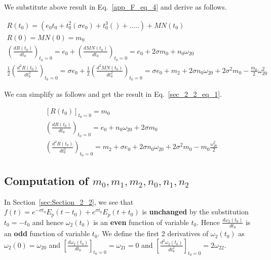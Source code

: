 \documentclass[11pt]{elsarticle}
\begin{document}
We substitute above result in Eq.~\ref{app_F_eq_4}  and derive as follows.

\begin{eqnarray*}\label{app_F_3_eq_3}  
R(t_0)= ( e_0 t_0 +t_0^2 (  \sigma e_0) + t_0^3 () + ..... ) + MN(t_0) \\
R(0) = MN(0) = m_0 \\
(\frac{dR(t_0)}{dt_0})_{t_0=0}  = e_0 +  (\frac{dMN(t_0)}{dt_0})_{t_0=0} = e_0 + 2 \sigma m_0 + n_0  \omega_{20}\\
\frac{1}{2} (\frac{d^{2}R(t_0)}{dt_0^{2}})_{t_0=0} = \sigma e_0 + \frac{1}{2} (\frac{d^{2}MN(t_0)}{dt_0^{2}})_{t_0=0} =  \sigma e_0 +  m_2 +  2 \sigma n_0 \omega_{20} + 2 \sigma^2 m_0 - \frac{m_0}{2} \omega_{20}^2  
\end{eqnarray*}
\begin{equation} \end{equation}

We can simplify as follows and get the result in Eq.~\ref{sec_2_2_eq_1}. %

\begin{eqnarray*}\label{app_F_3_eq_4}   
[ R(t_0) ]_{t_0=0} = m_0 \\
(\frac{dR(t_0)}{dt_0})_{t_0=0} =   e_0  + n_0  \omega_{20} + 2 \sigma m_0 \\
(\frac{d^2R(t_0)}{dt_0^2})_{t_0=0} =   m_2 + \sigma e_0  +2 \sigma n_0  \omega_{20}   + 2 \sigma^{2} m_0 - m_0 \frac{\omega_{20}^2}{2} 
\end{eqnarray*}
\begin{equation} \end{equation}


\subsection{\label{sec:Appendix_F_4} \textbf{Computation of $m_0, m_1, m_2, n_0, n_1, n_2$} \protect\\  \lowercase{} }


In Section~\ref{sec:Section_2_2}, we see that $f(t) = e^{-\sigma t_0} E_p(t - t_0) +  e^{\sigma t_0} E_p(t + t_0)$ is \textbf{unchanged} by the substitution $t_0=-t_0$ and hence $\omega_2(t_0)$ is an \textbf{even} function of variable $t_0$. Hence $\frac{d\omega_2(t_0)}{dt_0}$ is an \textbf{odd} function of variable $t_0$. We define the first 2 derivatives of $\omega_2(t_0)$ as $\omega_{2}(0)=\omega_{20}$ and $[\frac{d\omega_2(t_0)}{dt_0}]_{t_0=0}=\omega_{21}=0$ and $[\frac{d^{2}\omega_2(t_0)}{dt_{0}^{2}}]_{t_0=0} = 2 \omega_{22} $.\\
\end{document}
